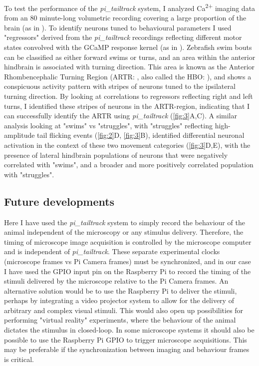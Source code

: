 \documentclass[9pt,lineno]{RandlettLab_elife}
\begin{document}
To test the performance of the \emph{pi\_tailtrack} system, I analyzed Ca\textsuperscript{2+} imaging data from an 80 minute-long volumetric recording covering a large proportion of the brain (as in \cite{Lamire2023-di}). To identify neurons tuned to behavioural parameters I used "regressors" derived from the \emph{pi\_tailtrack} recordings reflecting different motor states convolved with the GCaMP response kernel (as in \cite{Miri2011-sr}). Zebrafish swim bouts can be classified as either forward swims or turns, and an area within the anterior hindbrain is associated with turning direction. This area is known as the Anterior Rhombencephalic Turning Region (ARTR: \cite{Dunn2016-bg}, also called the HBO: \cite{Ahrens2013-xh, Wolf2017-ma}), and shows a conspicuous activity pattern with stripes of neurons tuned to the ipsilateral turning direction. By looking at correlations to regressors reflecting right and left turns, I identified these stripes of neurons in the ARTR-region, indicating that I can successfully identify the ARTR using \emph{pi\_tailtrack} (\autoref{fig:3}A,C). A similar analysis looking at "swims" vs "struggles", with "struggles" reflecting high-amplitude tail flicking events (\autoref{fig:2}D, \autoref{fig:3}B), identified differential neuronal activation in the context of these two movement categories (\autoref{fig:3}D,E), with the presence of lateral hindbrain populations of neurons that were negatively correlated with "swims", and a broader and more positively correlated population with "struggles". 


\subsection{Future developments}

Here I have used the \emph{pi\_tailtrack} system to simply record the behaviour of the animal independent of the microscopy or any stimulus delivery. Therefore, the timing of microscope image acquisition is controlled by the microscope computer and is independent of \emph{pi\_tailtrack}. These separate experimental clocks (microscope frames vs Pi Camera frames) must be synchronized, and in our case I have used the GPIO input pin on the Raspberry Pi to record the timing of the stimuli delivered by the microscope relative to the Pi Camera frames. An alternative solution would be to use the Raspberry Pi to deliver the stimuli, perhaps by integrating a video projector system to allow for the delivery of arbitrary and complex visual stimuli. This would also open up possibilities for performing "virtual reality" experiments, where the behaviour of the animal dictates the stimulus in closed-loop. In some microscope systems it should also be possible to use the Raspberry Pi GPIO to trigger microscope acquisitions. This may be preferable if the synchronization between imaging and behaviour frames is critical. 
\end{document}
